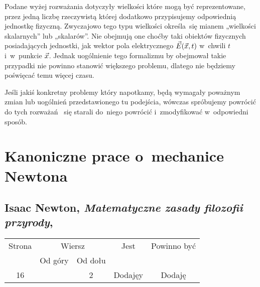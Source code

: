 \documentclass[a4paper,11pt]{article}
\numberwithin{equation}{section}
\begin{document}
Podane wyżej rozważania dotyczyły wielkości które mogą być reprezentowane,
przez jedną liczbę rzeczywistą której dodatkowo przypisujemy odpowiednią
jednostkę fizyczną. Zwyczajowo tego typu wielkości określa~się mianem
„wielkości skalarnych” lub „skalarów”. Nie obejmują one choćby taki
obiektów fizycznych posiadających jednostki, jak wektor pola elektrycznego
$\vec{E}( \vec{x}, t )$ w~chwili $t$ i~w~punkcie $\vec{x}$. Jednak uogólnienie
tego formalizmu by obejmował takie przypadki nie powinno stanowić
większego problemu, dlatego nie będziemy poświęcać temu więcej czasu.

Jeśli jakiś konkretny problemy który napotkamy, będą wymagały poważnym zmian
lub uogólnień przedstawionego tu podejścia, wówczas spróbujemy powrócić do
tych rozważań ~się starali do~niego powrócić
i~zmodyfikować w~odpowiedni sposób.










\newpage
\section{Kanoniczne prace o~mechanice Newtona}




\subsection{ %
  Isaac Newton,
  \textit{Matematyczne zasady filozofii przyrody},
  \cite{NewtonMatematyczneZasadyFilozofiiPrzyrody2011}}




\begin{center}

  \begin{tabular}{|c|c|c|c|c|}
    \hline
    Strona & \multicolumn{2}{c|}{Wiersz} & Jest
                              & Powinno być \\ \cline{2-3}
    & Od góry & Od dołu & & \\
    \hline
    16  & &  2 & Dodajęy & Dodaję \\
    \hline
  \end{tabular}

\end{center}
\end{document}
